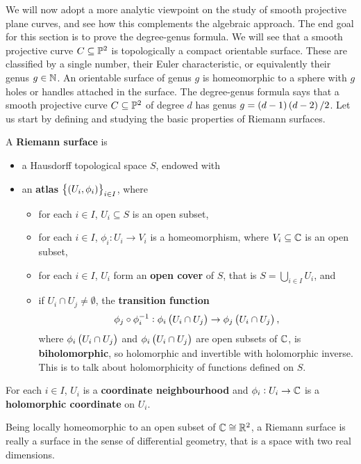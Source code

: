 We will now adopt a more analytic viewpoint on the study of smooth projective plane curves, and see how this complements the algebraic approach. The end goal for this section is to prove the degree-genus formula. We will see that a smooth projective curve $ C \subseteq \P^2 $ is topologically a compact orientable surface. These are classified by a single number, their Euler characteristic, or equivalently their genus $ g \in \N $. An orientable surface of genus $ g $ is homeomorphic to a sphere with $ g $ holes or handles attached in the surface. The degree-genus formula says that a smooth projective curve $ C \subseteq \P^2 $ of degree $ d $ has genus $ g = \br{d - 1}\br{d - 2} / 2 $. Let us start by defining and studying the basic properties of Riemann surfaces.

\begin{definition}
\label{def:15.1}
A \textbf{Riemann surface} is
\begin{itemize}
\item a Hausdorff topological space $ S $, endowed with
\item an \textbf{atlas} $ \cbr{\br{U_i, \phi_i}}_{i \in I} $, where
\begin{itemize}
\item for each $ i \in I $, $ U_i \subseteq S $ is an open subset,
\item for each $ i \in I $, $ \phi_i : U_i \to V_i $ is a homeomorphism, where $ V_i \subseteq \C $ is an open subset,
\item for each $ i \in I $, $ U_i $ form an \textbf{open cover} of $ S $, that is $ S = \bigcup_{i \in I} U_i $, and
\item if $ U_i \cap U_j \ne \emptyset $, the \textbf{transition function}
$$ \phi_j \circ \phi_i^{-1} : \phi_i\br{U_i \cap U_j} \to \phi_j\br{U_i \cap U_j}, $$
where $ \phi_i\br{U_i \cap U_j} $ and $ \phi_i\br{U_i \cap U_j} $ are open subsets of $ \C $, is \textbf{biholomorphic}, so holomorphic and invertible with holomorphic inverse. This is to talk about holomorphicity of functions defined on $ S $.
\end{itemize}
\end{itemize}
For each $ i \in I $, $ U_i $ is a \textbf{coordinate neighbourhood} and $ \phi_i : U_i \to \C $ is a \textbf{holomorphic coordinate} on $ U_i $.
\end{definition}

\begin{remark}
Being locally homeomorphic to an open subset of $ \C \cong \R^2 $, a Riemann surface is really a surface in the sense of differential geometry, that is a space with two real dimensions.
\end{remark}

